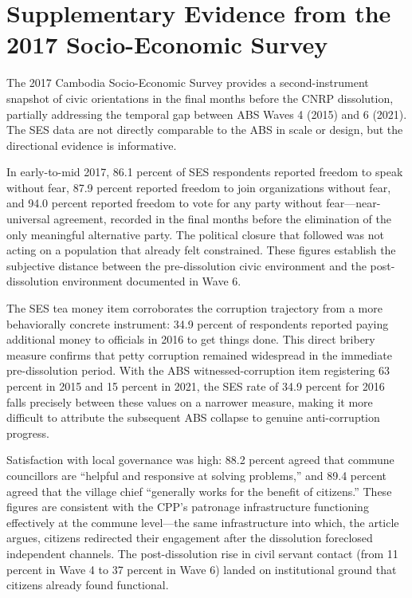 \documentclass[
  12pt,
  letterpaper]{article}
\begin{document}
\section{Supplementary Evidence from the 2017 Socio-Economic
Survey}\label{supplementary-evidence-from-the-2017-socio-economic-survey}

The 2017 Cambodia Socio-Economic Survey provides a second-instrument
snapshot of civic orientations in the final months before the CNRP
dissolution, partially addressing the temporal gap between ABS Waves 4
(2015) and 6 (2021). The SES data are not directly comparable to the ABS
in scale or design, but the directional evidence is informative.

In early-to-mid 2017, 86.1 percent of SES respondents reported freedom
to speak without fear, 87.9 percent reported freedom to join
organizations without fear, and 94.0 percent reported freedom to vote
for any party without fear---near-universal agreement, recorded in the
final months before the elimination of the only meaningful alternative
party. The political closure that followed was not acting on a
population that already felt constrained. These figures establish the
subjective distance between the pre-dissolution civic environment and
the post-dissolution environment documented in Wave 6.

The SES tea money item corroborates the corruption trajectory from a
more behaviorally concrete instrument: 34.9 percent of respondents
reported paying additional money to officials in 2016 to get things
done. This direct bribery measure confirms that petty corruption
remained widespread in the immediate pre-dissolution period. With the
ABS witnessed-corruption item registering 63 percent in 2015 and 15
percent in 2021, the SES rate of 34.9 percent for 2016 falls precisely
between these values on a narrower measure, making it more difficult to
attribute the subsequent ABS collapse to genuine anti-corruption
progress.

Satisfaction with local governance was high: 88.2 percent agreed that
commune councillors are ``helpful and responsive at solving problems,''
and 89.4 percent agreed that the village chief ``generally works for the
benefit of citizens.'' These figures are consistent with the CPP's
patronage infrastructure functioning effectively at the commune
level---the same infrastructure into which, the article argues, citizens
redirected their engagement after the dissolution foreclosed independent
channels. The post-dissolution rise in civil servant contact (from 11
percent in Wave 4 to 37 percent in Wave 6) landed on institutional
ground that citizens already found functional.
\end{document}
